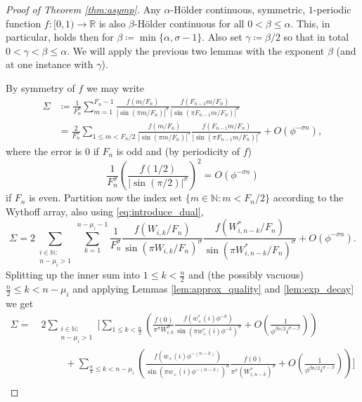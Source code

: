 \documentclass[10pt,a4paper]{amsart}
\newcommand{\bbN}{\mathbb{N}}
\newcommand{\bbR}{\mathbb{R}}
\begin{document}
\begin{proof}[Proof of Theorem \ref{thm:asymp}]
    Any $\alpha$-Hölder continuous, symmetric, $1$-periodic function $f: [0, 1) \rightarrow \bbR$ is also $\beta$-Hölder continuous for all $0 < \beta \leq \alpha$. This, in particular, holds then for $\beta \coloneq \min\{\alpha, \sigma -1\}$. Also set $\gamma \coloneqq \beta/2$ so that in total $0 < \gamma < \beta \leq \alpha$. We will apply the previous two lemmas with the exponent $\beta$ (and at one instance with $\gamma$).

    By symmetry of $f$ we may write
    \begin{align*}
        \Sigma & \coloneqq \frac1{F_n^\sigma} \sum_{m = 1}^{F_n-1} \frac{f(m/F_n)}{\left|{\sin(\pi m/F_n)}\right|^\sigma} \frac{f(F_{n-1}m/F_n)}{\left|{\sin(\pi F_{n-1}m/F_n)}\right|^\sigma} \\
        & = \frac2{F_n^\sigma} \sum_{1 \leq m < F_n/2} \frac{f(m/F_n)}{\left|{\sin(\pi m/F_n)}\right|^\sigma} \frac{f(F_{n-1}m/F_n)}{\left|{\sin(\pi F_{n-1}m/F_n)}\right|^\sigma} + O(\phi^{-\sigma n}),
    \end{align*}
    where the error is $0$ if $F_n$ is odd and (by periodicity of $f$)
    $$
    \frac1{F_n^\sigma} \left(\frac{f(1/2)}{\left|{\sin(\pi/2)}\right|^\sigma}\right)^2 = O(\phi^{-\sigma n})
    $$
    if $F_n$ is even. Partition now the index set $\{m \in \bbN: m < F_n/2\}$ according to the Wythoff array, also using \eqref{eq:introduce_dual},
    $$
    \Sigma = 2\sum_{\substack{i \in \bbN: \\ n - \mu_i > 1}} \sum_{k=1}^{n-\mu_i-1} \frac1{F_n^\sigma} \frac{f(W_{i, k}/F_n)}{\sin(\pi W_{i, k}/F_n)^\sigma} \frac{f(W_{i, n-k}^*/F_n)}{\sin(\pi W_{i, n-k}^*/F_n)^\sigma} + O(\phi^{-\sigma n}).
    $$
    Splitting up the inner sum into $1 \leq k < \frac n2$ and (the possibly vacuous) $\frac n2 \leq k < n-\mu_i$ and applying Lemmas \ref{lem:approx_quality} and \ref{lem:exp_decay} we get
    \begin{align*}
        \Sigma = ~& 2\sum_{\substack{i \in \bbN: \\ n - \mu_i > 1}} \Bigg[ \sum_{1 \leq k < \frac n2} \left(\frac{f(0)}{\pi^\sigma W_{i, k}^\sigma} \frac{f(w_+^*(i) \phi^{-k})}{\sin(\pi w_+^*(i) \phi^{-k})^\sigma} + O\left(\frac1{\phi^{\beta n/2} i^{\sigma-\beta}}\right)\right) \\
        & ~~~~~~~~~~~ + \sum_{\frac n2 \leq k < n-\mu_i} \left(\frac{f(w_+(i) \phi^{-(n-k)})}{{\sin(\pi w_+(i) \phi^{-(n-k)})}^\sigma} \frac{f(0)}{ \pi^\sigma (W_{i, n-k}^*)^\sigma} + O\left(\frac1{\phi^{\beta n/2} i^{\sigma-\beta}}\right)\right) \Bigg] \\

\end{align*}
\end{proof}
\end{document}
